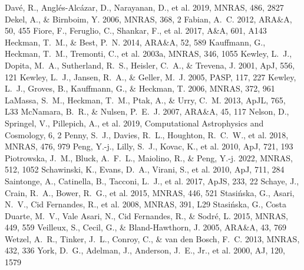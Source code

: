 \documentclass[twocolumn]{aastex631}
\begin{document}
\begin{thebibliography}{}
 Dav{\'e}, R., Angl{\'e}s-Alc{\'a}zar, D., Narayanan, D., et al. 2019, MNRAS, 486, 2827
 Dekel, A., \& Birnboim, Y. 2006, MNRAS, 368, 2
 Fabian, A.~C. 2012, ARA\&A, 50, 455
 Fiore, F., Feruglio, C., Shankar, F., et al. 2017, A\&A, 601, A143
 Heckman, T.~M., \& Best, P.~N. 2014, ARA\&A, 52, 589
 Kauffmann, G., Heckman, T.~M., Tremonti, C., et al. 2003a, MNRAS, 346, 1055
 Kewley, L.~J., Dopita, M.~A., Sutherland, R.~S., Heisler, C.~A., \& Trevena, J. 2001, ApJ, 556, 121
 Kewley, L.~J., Jansen, R.~A., \& Geller, M.~J. 2005, PASP, 117, 227
 Kewley, L.~J., Groves, B., Kauffmann, G., \& Heckman, T. 2006, MNRAS, 372, 961
 LaMassa, S.~M., Heckman, T.~M., Ptak, A., \& Urry, C.~M. 2013, ApJL, 765, L33
 McNamara, B.~R., \& Nulsen, P.~E.~J. 2007, ARA\&A, 45, 117
 Nelson, D., Springel, V., Pillepich, A., et al. 2019, Computational Astrophysics and Cosmology, 6, 2
 Penny, S.~J., Davies, R.~L., Houghton, R.~C.~W., et al. 2018, MNRAS, 476, 979
 Peng, Y.-j., Lilly, S.~J., Kovac, K., et al. 2010, ApJ, 721, 193
 Piotrowska, J.~M., Bluck, A.~F.~L., Maiolino, R., \& Peng, Y.-j. 2022, MNRAS, 512, 1052
 Schawinski, K., Evans, D.~A., Virani, S., et al. 2010, ApJ, 711, 284
 Saintonge, A., Catinella, B., Tacconi, L.~J., et al. 2017, ApJS, 233, 22
 Schaye, J., Crain, R.~A., Bower, R.~G., et al. 2015, MNRAS, 446, 521
 Stasi{\'n}ska, G., Asari, N.~V., Cid Fernandes, R., et al. 2008, MNRAS, 391, L29
 Stasi{\'n}ska, G., Costa Duarte, M.~V., Vale Asari, N., Cid Fernandes, R., \& Sodr{\'e}, L. 2015, MNRAS, 449, 559
 Veilleux, S., Cecil, G., \& Bland-Hawthorn, J. 2005, ARA\&A, 43, 769
 Wetzel, A.~R., Tinker, J.~L., Conroy, C., \& van den Bosch, F.~C. 2013, MNRAS, 432, 336
 York, D.~G., Adelman, J., Anderson, J.~E., Jr., et al. 2000, AJ, 120, 1579
\end{thebibliography}
\end{document}
